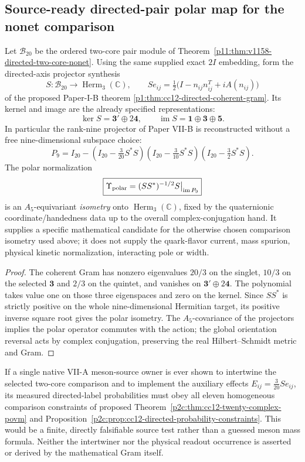 \documentclass[12pt,a4paper]{article}
\begin{document}
\subsection{Source-ready directed-pair polar map for the nonet comparison}
\label{p11:sec:cc12-nonet-polar-map}
\begin{corollary}
\label{p11:cor:cc12-nonet-coherent-polar-map}
Let $\mathcal B_{20}$ be the ordered two-core pair module of
Theorem~\ref{p11:thm:v1158-directed-two-core-nonet}.
Using the same supplied exact $2I$ embedding, form the directed-axis
projector synthesis
\[
 S:\mathcal B_{20}\to\operatorname{Herm}_3(\mathbb C),
 \qquad Se_{ij}=\tfrac12\bigl(I-n_{ij}n_{ij}^T+iA(n_{ij})\bigr)
\]
of the proposed Paper-I-B theorem
\ref{p1:thm:cc12-directed-coherent-gram}. Its kernel and image
are the already specified representations:
\[
 \ker S=\mathbf3'\oplus2\mathbf4,
 \qquad \operatorname{im}S=\mathbf1\oplus\mathbf3\oplus\mathbf5.
\]
In particular the rank-nine projector of Paper VII-B is reconstructed
without a free nine-dimensional subspace choice:
\[
 \boxed{P_9=I_{20}
 -(I_{20}-\tfrac3{20}S^*S)
  (I_{20}-\tfrac3{10}S^*S)
  (I_{20}-\tfrac32S^*S).}
\]
The polar normalization
\[
 \boxed{\Upsilon_{\rm polar}
   =(SS^*)^{-1/2}S\big|_{\operatorname{im}P_9}}
\]
is an $A_5$-equivariant \emph{isometry} onto
$\operatorname{Herm}_3(\mathbb C)$, fixed by the quaternionic
coordinate/handedness data up to the overall complex-conjugation hand.
It supplies a specific mathematical candidate for the otherwise
chosen comparison isometry used above; it does not supply the
quark-flavor current, mass spurion, physical kinetic normalization,
interacting pole or width.
\end{corollary}
\begin{proof}
The coherent Gram has nonzero eigenvalues $20/3$ on the singlet,
$10/3$ on the selected $\mathbf3$ and $2/3$ on the quintet, and
vanishes on $\mathbf3'\oplus2\mathbf4$. The polynomial takes value
one on those three eigenspaces and zero on the kernel.
Since $SS^*$ is strictly positive on the whole nine-dimensional
Hermitian target, its positive inverse square root gives the polar
isometry. The $A_5$-covariance of the projectors implies the polar
operator commutes with the action; the global orientation reversal
acts by complex conjugation, preserving the real Hilbert--Schmidt
metric and Gram.
\end{proof}

\begin{remark}
If a single native VII-A meson-source owner is ever shown to
intertwine the selected two-core comparison and to implement the
auxiliary effects $E_{ij}=\tfrac3{20}Se_{ij}$, its measured
directed-label probabilities must obey all eleven homogeneous
comparison constraints of proposed
Theorem~\ref{p2c:thm:cc12-twenty-complex-povm} and
Proposition~\ref{p2c:prop:cc12-directed-probability-constraints}.
This would be a finite, directly falsifiable source test rather than
a guessed meson mass formula. Neither the intertwiner nor the
physical readout occurrence is asserted or derived by the
mathematical Gram itself.
\end{remark}
\end{document}
